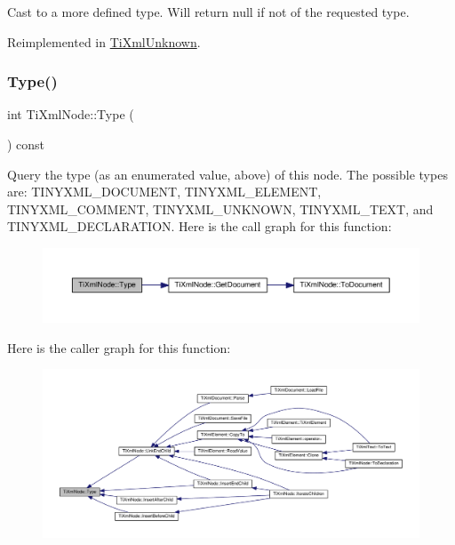 Cast to a more defined type. Will return null if not of the requested type. 



Reimplemented in \hyperlink{class_ti_xml_unknown_a67c9fd22940e8c47f706a72cdd2e332c}{Ti\+Xml\+Unknown}.

\mbox{\label{class_ti_xml_node_a0f4dd916b2afc2ab2f1a84f3e2b8fd5d}} 
\subsubsection{\texorpdfstring{Type()}{Type()}}
{\footnotesize\ttfamily int Ti\+Xml\+Node\+::\+Type (\begin{DoxyParamCaption}{ }\end{DoxyParamCaption}) const\hspace{0.3cm}{\ttfamily [inline]}}

Query the type (as an enumerated value, above) of this node. The possible types are\+: T\+I\+N\+Y\+X\+M\+L\+\_\+\+D\+O\+C\+U\+M\+E\+NT, T\+I\+N\+Y\+X\+M\+L\+\_\+\+E\+L\+E\+M\+E\+NT, T\+I\+N\+Y\+X\+M\+L\+\_\+\+C\+O\+M\+M\+E\+NT, T\+I\+N\+Y\+X\+M\+L\+\_\+\+U\+N\+K\+N\+O\+WN, T\+I\+N\+Y\+X\+M\+L\+\_\+\+T\+E\+XT, and T\+I\+N\+Y\+X\+M\+L\+\_\+\+D\+E\+C\+L\+A\+R\+A\+T\+I\+ON. Here is the call graph for this function\+:
\nopagebreak
\begin{figure}[H]
\begin{center}
\leavevmode
\includegraphics[width=350pt]{class_ti_xml_node_a0f4dd916b2afc2ab2f1a84f3e2b8fd5d_cgraph}
\end{center}
\end{figure}
Here is the caller graph for this function\+:
\nopagebreak
\begin{figure}[H]
\begin{center}
\leavevmode
\includegraphics[width=350pt]{class_ti_xml_node_a0f4dd916b2afc2ab2f1a84f3e2b8fd5d_icgraph}
\end{center}
\end{figure}
\mbox{\label{class_ti_xml_node_ad44dfe927d49a74dd78b72b7514417ad}} 
